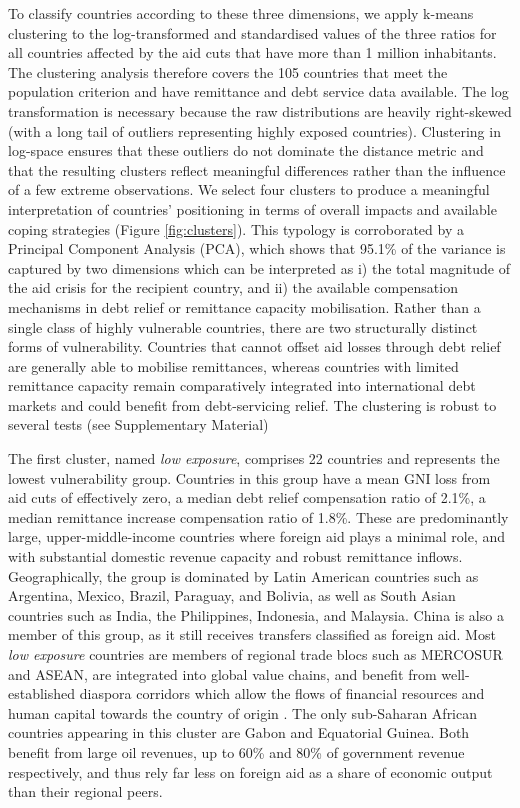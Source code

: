 \documentclass[fleqn,10pt,twocolumn]{wlscirep}
\begin{document}
{To classify countries according to these three dimensions, we apply k-means clustering to the log-transformed and standardised values of the three ratios for all countries affected by the aid cuts that have more than 1 million inhabitants. The clustering analysis therefore covers the 105 countries that meet the population criterion and have remittance and debt service data available. The log transformation is necessary because the raw distributions are heavily right-skewed (with a long tail of outliers representing highly exposed countries). Clustering in log-space ensures that these outliers do not dominate the distance metric and that the resulting clusters reflect meaningful differences rather than the influence of a few extreme observations. We select four clusters to produce a meaningful interpretation of countries' positioning in terms of overall impacts and available coping strategies (Figure \ref{fig:clusters}). This typology is corroborated by a Principal Component Analysis (PCA), which shows that 95.1\% of the variance is captured by two dimensions which can be interpreted as i) the total magnitude of the aid crisis for the recipient country, and ii) the available compensation mechanisms in debt relief or remittance capacity mobilisation. Rather than a single class of highly vulnerable countries, there are two structurally distinct forms of vulnerability. Countries that cannot offset aid losses through debt relief are generally able to mobilise remittances, whereas countries with limited remittance capacity remain comparatively integrated into international debt markets and could benefit from debt-servicing relief. The clustering is robust to several tests (see Supplementary Material)

{
The first cluster, named \textit{low exposure}, comprises 22 countries and represents the lowest vulnerability group. Countries in this group have a mean GNI loss from aid cuts of effectively zero, a median debt relief compensation ratio of 2.1\%, a median remittance increase compensation ratio of 1.8\%. These are predominantly large, upper-middle-income countries where foreign aid plays a minimal role, and with substantial domestic revenue capacity and robust remittance inflows. Geographically, the group is dominated by Latin American countries such as Argentina, Mexico, Brazil, Paraguay, and Bolivia, as well as South Asian countries such as India, the Philippines, Indonesia, and Malaysia. China is also a member of this group, as it still receives transfers classified as foreign aid. Most \textit{low exposure} countries are members of regional trade blocs such as MERCOSUR and ASEAN, are integrated into global value chains, and benefit from well-established diaspora corridors which allow the flows of financial resources and human capital towards the country of origin \cite{kapur2010diaspora}. The only sub-Saharan African countries appearing in this cluster are Gabon and Equatorial Guinea. Both benefit from large oil revenues, up to 60\% and 80\% of government revenue respectively, and thus rely far less on foreign aid as a share of economic output than their regional peers.
}

}
\end{document}
